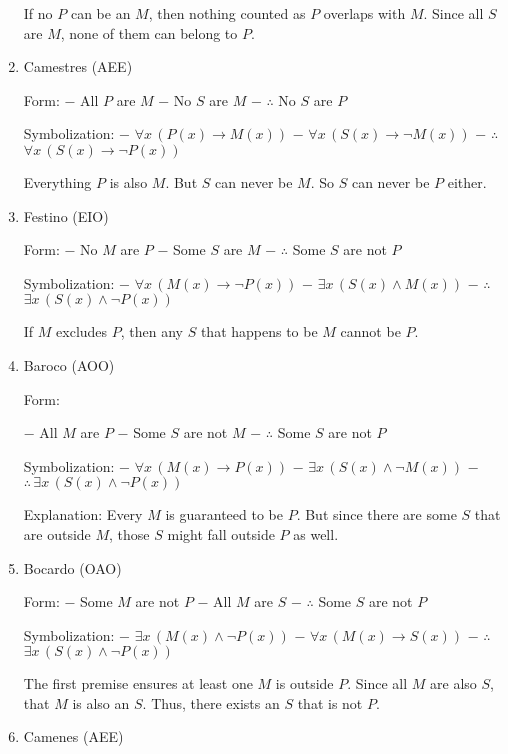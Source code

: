 \begin{enumerate}
  If no \(P\) can be an \(M\), then nothing counted as \(P\) overlaps
  with \(M\). Since all \(S\) are \(M\), none of them can belong to
  \(P\).
\item
  Camestres (AEE)

  Form: − All \(P\) are \(M\) − No \(S\) are \(M\) − \(\therefore\) No
  \(S\) are \(P\)

  Symbolization: − \(\forall x \, (P(x) \rightarrow M(x))\) −
  \(\forall x \, (S(x) \rightarrow \lnot M(x))\) − \(\therefore\)
  \(\forall x \, (S(x) \rightarrow \lnot P(x))\)

  Everything \(P\) is also \(M\). But \(S\) can never be \(M\). So \(S\)
  can never be \(P\) either.
\item
  Festino (EIO)

  Form: − No \(M\) are \(P\) − Some \(S\) are \(M\) − \(\therefore\)
  Some \(S\) are not \(P\)

  Symbolization: − \(\forall x \, (M(x) \rightarrow \lnot P(x))\) −
  \(\exists x \, (S(x) \land M(x))\) − \(\therefore\)
  \(\exists x \, (S(x) \land \lnot P(x))\)

  If \(M\) excludes \(P\), then any \(S\) that happens to be \(M\)
  cannot be \(P\).
\item
  Baroco (AOO)

  Form:

  − All \(M\) are \(P\) − Some \(S\) are not \(M\) − \(\therefore\) Some
  \(S\) are not \(P\)

  Symbolization: − \(\forall x \, (M(x) \rightarrow P(x))\) −
  \(\exists x \, (S(x) \land \lnot M(x))\) −
  \(\therefore \, \exists x \, (S(x) \land \lnot P(x))\)

  Explanation: Every \(M\) is guaranteed to be \(P\). But since there
  are some \(S\) that are outside \(M\), those \(S\) might fall outside
  \(P\) as well.
\item
  Bocardo (OAO)

  Form: − Some \(M\) are not \(P\) − All \(M\) are \(S\) −
  \(\therefore\) Some \(S\) are not \(P\)

  Symbolization: − \(\exists x \, (M(x) \land \lnot P(x))\) −
  \(\forall x \, (M(x) \rightarrow S(x))\) − \(\therefore\)
  \(\exists x \, (S(x) \land \lnot P(x))\)

  The first premise ensures at least one \(M\) is outside \(P\). Since
  all \(M\) are also \(S\), that \(M\) is also an \(S\). Thus, there
  exists an \(S\) that is not \(P\).
\item
  Camenes (AEE)


\end{enumerate}
